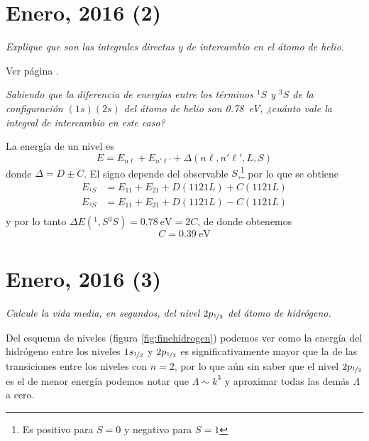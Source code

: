 \chapter{Enero, 2016 (2)}
\begin{tcolorbox}[halign=left]
  \emph{Explique que son las integrales directas y de intercambio en
    el átomo de helio.}
\end{tcolorbox}
Ver página \pageref{paragraph:intinterc}.
\begin{tcolorbox}[halign=left]
  \emph{Sabiendo que la diferencia de energías entre los términos
    ${}^1S$ y ${}^3S$ de la configuración $(1s)(2s)$ del átomo de helio
  son \SI{0.78}{\eV}, ¿cuánto vale la integral de intercambio en este caso?}
\end{tcolorbox}

La energía de un nivel es
\begin{equation}
    E = E_{n\ell} + E_{n'\ell'} + \Delta (n\ell,n'\ell',L,S) 
\end{equation}
donde $\Delta  = D \pm C$. El signo depende del observable
$S$,\footnote{Es positivo para $S=0$ y negativo para $S=1$} por
lo que se obtiene
\begin{align}
  E_{{}^1\!S} &= E_{11} + E_{21} + D(1121L) + C(1121L) \\
  E_{{}^3\!S} &= E_{11} + E_{21} + D(1121L) - C(1121L) \\
\end{align}
y por lo tanto $\Delta E({}^1,S{}^3S) = \SI{0.78}{\eV} = 2C$, de donde
obtenemos
\begin{equation}
  \boxed{
  C = \SI{0.39}{\eV}
  }
\end{equation}


\chapter{Enero, 2016 (3)}
\begin{tcolorbox}[halign=left]
  \emph{Calcule la vida media, en segundos, del nivel $2p_{{\nicefrac{1}{2}}}$ del
    átomo de hidrógeno.}
\end{tcolorbox}

Del esquema de niveles (figura \ref{fig:finehidrogen}) podemos ver como la energía del hidrógeno entre
los niveles $1s_{{\nicefrac{1}{2}}}$ y $2p_{{\nicefrac{1}{2}}}$ es significativamente mayor que
la de las transiciones entre los niveles con $n=2$, por lo que aún sin
saber que el nivel $2p_{{\nicefrac{1}{2}}}$ es el
de menor energía podemos notar que $\Lambda \sim k^3$ y aproximar
todas las demás $\Lambda$ a cero.

